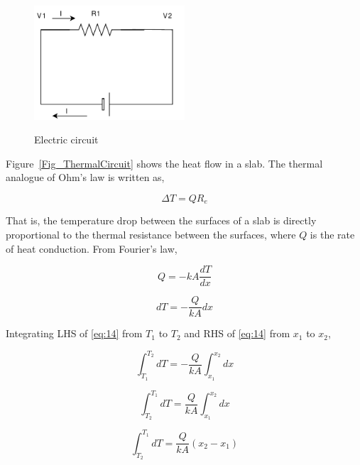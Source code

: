 \begin{figure}
\begin{center}
{
 \includegraphics[width=0.5\textwidth]{electriccircuit.pdf}
}
\caption{Electric circuit}
\label{Fig_electricCircuit}
\end{center}
\end{figure}

Figure~\ref{Fig_ThermalCircuit} shows the heat flow in a slab.  The thermal
analogue of Ohm's law is written as,

\begin{equation}
\Delta T=QR_e \label{eq:12}
\end{equation}

That is, the temperature drop between the surfaces of a slab is directly
proportional to the thermal resistance between the surfaces, where $Q$ is the
rate of heat conduction.  From Fourier's law,

\begin{equation}
Q=-kA\frac{ dT}{ dx} \label{eq:13} 
\end{equation}

\begin{equation}
dT=-\frac{Q}{kA}dx \label{eq:14}
\end{equation}

Integrating LHS of \ref{eq:14} from $T_1$ to $T_2$ and RHS of \ref{eq:14} from
$x_1$ to $x_2$,

\begin{equation}
\int^{T_2}_{T_1}dT=-\frac{Q}{kA}\int^{x_2}_{x_1}dx \label{eq:15}
\end{equation}

\begin{equation}
\int^{T_1}_{T_2}dT=\frac{Q}{kA}\int^{x_2}_{x_1}dx  \label{eq:16}
\end{equation}

\begin{equation}
\int^{T_1}_{T_2}dT=\frac{Q}{kA}(x_2-x_1)  \label{eq:17}
\end{equation}

